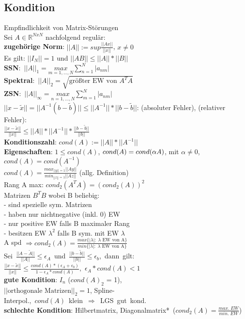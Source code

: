\subsection{Kondition}
Empfindlichkeit von Matrix-Störungen\\
Sei $A \in \mathbb{R}^{NxN}$ nachfolgend regulär:\\
\textbf{zugehörige Norm}: $||A|| := sup\frac{||Ax||}{||x||}$, $x \neq 0$\\
Es gilt: $||I_N|| = 1$ und $||AB|| \leq ||A|| * ||B||$\\
\mbox{\textbf{SSN}: $||A||_1 = \underset{m = 1,...,N}{max}\sum_{n=1}^N|a_{nm}|$}\\
\mbox{\textbf{Spektral}: $||A||_2 = \sqrt{\text{größter EW von } A^TA}$}\\
\mbox{\textbf{ZSN}: $||A||_{\infty} = \underset{n=1,...,N}{max}\sum_{m=1}^N|a_{nm}|$}\\
${||x - \widetilde{x}}|| = ||A^{-1}(b - \widetilde{b})|| \leq ||A^{-1}|| * ||b-\widetilde{b}||$: (absoluter Fehler), (relativer Fehler):\\
$\frac{||x - \widetilde{x}||}{||x||} \leq ||A||*||A^{-1}||*\frac{||b-\widetilde{b}||}{||b||}$\\
\textbf{Konditionszahl}: $cond(A) := ||A||*||A^{-1}||$\\
\textbf{Eigenschaften}: $1 \leq cond(A)$, $cond(A) = \\cond(\alpha A)$, mit \mbox{$\alpha \neq 0$, $cond(A) = cond(A^{-1})$}\\
$cond(A) = \frac{max_{||y|| = 1}||Ay||}{min_{||z|| = 1}||Az||}$ (allg. Definition)\\
Rang A max: $cond_2(A^TA) = (cond_2(A))^2$\\
Matrizen $B^TB$ wobei B beliebig:\\
- sind spezielle sym. Matrizen\\
- haben nur nichtnegative (inkl. 0) EW\\
- nur positive EW falls B maximaler Rang\\
- besitzen EW $\lambda^2$ falls B sym. mit EW $\lambda$\\
A spd $\Rightarrow cond_2(A) = \frac{max\{|\lambda|:\; \lambda \text{ EW von A}\}}{min\{|\lambda|:\; \lambda \text{ EW von A}\}}$\\
\mbox{Sei $\frac{||A-\widetilde{A}||}{||A||} \leq \epsilon_A$ und $\frac{||b-\widetilde{b}||}{||b||} \leq \epsilon_b$, dann gilt:}\\
\mbox{$\frac{||x-\widetilde{x}||}{||x||} \leq \frac{cond(A) * (\epsilon_A + \epsilon_b)}{1-\epsilon_A * cond(A)}$, $\epsilon_A * cond(A) < 1$}\\ 
\textbf{gute Kondition}: $I_n$ ($cond(A)_2$ = 1),\\ $||\text{orthogonale Matrizen}||_2 = 1$, Spline-\\ \mbox{Interpol., $cond(A)$ klein $\Rightarrow$ LGS gut kond.}\\
\textbf{schlechte Kondition}: Hilbertmatrix, \mbox{Diagonalmatrix* ($cond_2(A) = \frac{max.\; EW}{min.\; EW}$)}

